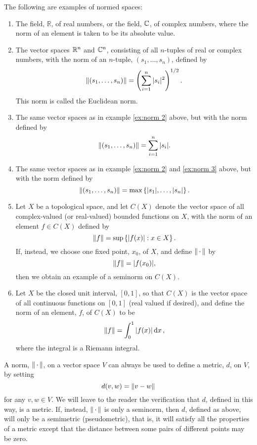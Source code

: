 \begin{examples}
The following are examples of normed spaces:
\begin{enumerate}
    \item\label{ex:norm 1}
    The field, $\mathbb{R}$, of real numbers, or the field, $\mathbb{C}$, of complex numbers, where the norm of an element is taken to be its absolute value.
    
    \item\label{ex:norm 2}
    The vector spaces $\mathbb{R}^n$ and $\mathbb{C}^n$, consisting of all $n$-tuples of real or complex numbers, with the norm of an $n$-tuple, $(s_1,\dots,s_n)$, defined by $$\norm{(s_1,\dots,s_n)}=\left(\sum_{i=1}^n|s_i|^2\right)^{1/2}.$$ This norm is called the Euclidean norm.
    
    \item\label{ex:norm 3}
    The same vector spaces as in example \ref{ex:norm 2} above, but with the norm defined by $$\norm{(s_1,\dots,s_n)}=\sum_{i=1}^n|s_i|.$$
    
    \item The same vector spaces as in example \ref{ex:norm 2} and \ref{ex:norm 3} above, but with the norm defined by $$\norm{(s_1,\dots,s_n)}=\max\left\{|s_1|,\dots,|s_n|\right\}.$$
    
    \item\label{ex:norm last}
    Let $X$ be a topological space, and let $C(X)$ denote the vector space of all complex-valued (or real-valued) bounded functions on $X$, with the norm of an element $f\in C(X)$ defined by $$\norm{f}=\sup\left\{|f(x)|:x\in X\right\}.$$ If, instead, we choose one fixed point, $x_0$, of $X$, and define $\norm{\,\cdot\,}$ by $$\norm{f}=|f(x_0)|,$$ then we obtain an example of a seminorm on $C(X)$.
    
    \item\label{ex:norm non banach}
    Let $X$ be the closed unit interval, $[0,1]$, so that $C(X)$ is the vector space of all continuous functions on $[0,1]$ (real valued if desired), and define the norm of an element, $f$, of $C(X)$ to be $$\norm{f}=\int_0^1|f(x)|\dd{x},$$ where the integral is a Riemann integral.
\end{enumerate}
\end{examples}

A norm, $\norm{\,\cdot\,}$, on a vector space $V$ can always be used to define a metric, $d$, on $V$, by setting $$d(v,w)=\norm{v-w}$$ for any $v,w\in V$. We will leave to the reader the verification that $d$, defined in this way, is a metric. If, instead, $\norm{\,\cdot\,}$ is only a seminorm, then $d$, defined as above, will only be a semimetric (pseudometric), that is, it will satisfy all the properties of a metric except that the distance between some pairs of different points may be zero.

